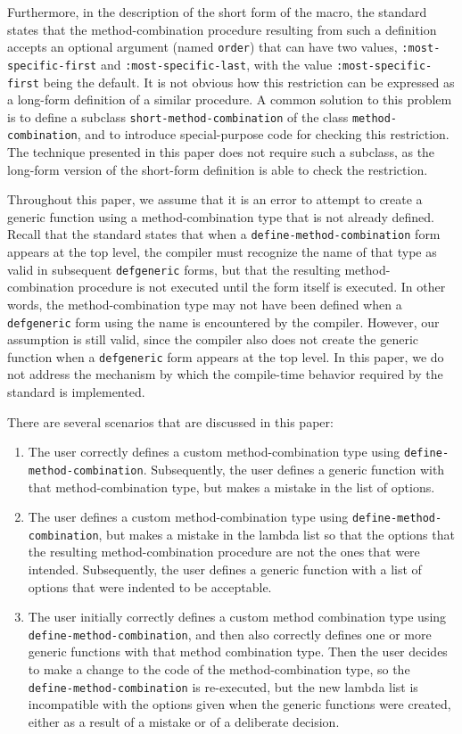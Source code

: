Furthermore, in the description of the short form of the macro, the
standard states that the method-combination procedure resulting from
such a definition accepts an optional argument (named \texttt{order})
that can have two values, \texttt{:most-specific-first} and
\texttt{:most-specific-last}, with the value
\texttt{:most-specific-first} being the default.  It is not obvious
how this restriction can be expressed as a long-form definition of a
similar procedure.  A common solution to this problem is to define a
subclass \texttt{short-method-combination} of the class
\texttt{method-combination}, and to introduce special-purpose code for
checking this restriction.  The technique presented in this paper does
not require such a subclass, as the long-form version of the
short-form definition is able to check the restriction.

Throughout this paper, we assume that it is an error to attempt to
create a generic function using a method-combination type that is not
already defined.  Recall that the standard states that when a
\texttt{define-method-combination} form appears at the top level, the
compiler must recognize the name of that type as valid in subsequent
\texttt{defgeneric} forms, but that the resulting method-combination
procedure is not executed until the form itself is executed.  In other
words, the method-combination type may not have been defined when a
\texttt{defgeneric} form using the name is encountered by the
compiler.  However, our assumption is still valid, since the compiler
also does not create the generic function when a \texttt{defgeneric}
form appears at the top level.  In this paper, we do not address the
mechanism by which the compile-time behavior required by the standard
is implemented.

There are several scenarios that are discussed in this paper:

\begin{enumerate}
\item The user correctly defines a custom method-combination type
  using \texttt{define-method-combination}.  Subsequently, the user
  defines a generic function with that method-combination type, but
  makes a mistake in the list of options.
\item The user defines a custom method-combination type using
  \texttt{define-method-combination}, but makes a mistake in the
  lambda list so that the options that the resulting
  method-combination procedure are not the ones that were intended.
  Subsequently, the user defines a generic function with a list of
  options that were indented to be acceptable.
\item The user initially correctly defines a custom method combination
  type using \texttt{define-method-combination}, and then also
  correctly defines one or more generic functions with that method
  combination type.  Then the user decides to make a change to the
  code of the method-combination type, so the
  \texttt{define-method-combination} is re-executed, but the new
  lambda list is incompatible with the options given when the generic
  functions were created, either as a result of a mistake or of a
  deliberate decision.
\end{enumerate}

